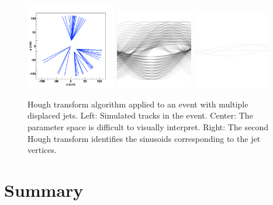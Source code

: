 \documentclass{JINST}
\begin{document}
\begin{figure}[!Hhtb]
\begin{center}
	\includegraphics[width=0.35\textwidth]{figs/jet2/tracks.pdf}
	\includegraphics[width=0.30\textwidth]{figs/jet2/accumulator.pdf}
	\includegraphics[width=0.30\textwidth]{figs/jet2/vertex.pdf}
	\caption{Hough transform algorithm applied to an event with multiple displaced jets. Left: Simulated
	tracks in the event. Center: The parameter space is difficult to visually interpret. Right: The
	second Hough transform identifies the sinusoids corresponding to the jet vertices.
	\label{fig:DisplacedJets}}
\end{center}
\end{figure}

%
\section{Summary}
%
\end{document}
